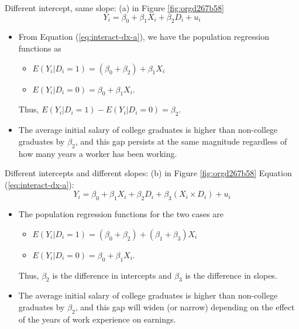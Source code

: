 \documentclass[presentation,10pt]{beamer}
\begin{document}
\begin{frame}[label={sec:orgb6c5195}]{Different intercept, same slope: (a) in Figure \ref{fig:orgd267b58}}
\begin{equation}
\label{eq:interact-dx-a}
Y_i = \beta_0 + \beta_1 X_i + \beta_2 D_i + u_i
\end{equation}

\begin{itemize}
\item From Equation (\ref{eq:interact-dx-a}), we have the population
regression functions as
\begin{itemize}
\item \(E(Y_i | D_i = 1) = (\beta_0 + \beta_2) + \beta_1 X_i\)
\item \(E(Y_i | D_i = 0) = \beta_0 + \beta_1 X_i\).
\end{itemize}
Thus, \(E(Y_i | D_i = 1) - E(Y_i | D_i = 0) = \beta_2\).

\item The average initial salary of college graduates is higher than
non-college graduates by \(\beta_2\), and this gap persists at the same
magnitude regardless of how many years a worker has been working.
\end{itemize}
\end{frame}

\begin{frame}[label={sec:org412e1bc}]{Different intercepts and different slopes: (b) in Figure \ref{fig:orgd267b58}}
Equation (\ref{eq:interact-dx-a}):
\begin{equation}
\label{eq:interact-dx-b}
Y_i = \beta_0 + \beta_1 X_i + \beta_2 D_i + \beta_3 (X_i \times D_i) + u_i
\end{equation}

\begin{itemize}
\item The population regression functions for the two cases are
\begin{itemize}
\item \(E(Y_i|D_i=1) = (\beta_0+\beta_2) + (\beta_1 + \beta_3) X_i\)
\item \(E(Y_i|D_i=0) = \beta_0 + \beta_1 X_i\).
\end{itemize}
Thus, \(\beta_2\) is the difference in intercepts and \(\beta_3\) is the
difference in slopes.

\item The average initial salary of college graduates is higher than
non-college graduates by \(\beta_2\), and this gap will widen (or
narrow) depending on the effect of the years of work experience on
earnings.
\end{itemize}
\end{frame}
\end{document}

